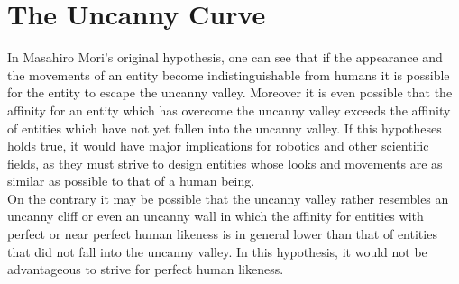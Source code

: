 \chapter{The Uncanny Curve}
In Masahiro Mori's original hypothesis, one can see that if the appearance and the movements of an entity become indistinguishable from humans it is possible for the entity to escape the uncanny valley. Moreover it is even possible that the affinity for an entity which has overcome the uncanny valley exceeds the affinity of entities which have not yet fallen into the uncanny valley. If this hypotheses holds true, it would have major implications for robotics and other scientific fields, as they must strive to design entities whose looks and movements are as similar as possible to that of a human being.\\
On the contrary it may be possible that the uncanny valley rather resembles an uncanny cliff or even an uncanny wall in which the affinity for entities with perfect or near perfect human likeness is in general lower than that of entities that did not fall into the uncanny valley. In this hypothesis, it would not be advantageous to strive for perfect human likeness.

